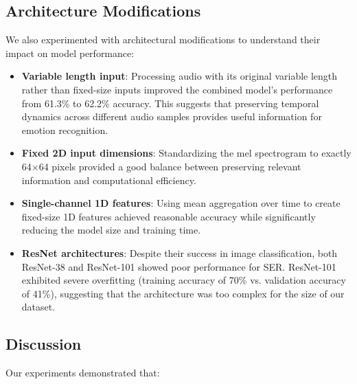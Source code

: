 \subsection{Architecture Modifications}

We also experimented with architectural modifications to understand their impact on model performance:

\begin{itemize}
    \item \textbf{Variable length input}: Processing audio with its original variable length rather than fixed-size inputs improved the combined model's performance from 61.3\% to 62.2\% accuracy. This suggests that preserving temporal dynamics across different audio samples provides useful information for emotion recognition.
    
    \item \textbf{Fixed 2D input dimensions}: Standardizing the mel spectrogram to exactly 64×64 pixels provided a good balance between preserving relevant information and computational efficiency.
    
    \item \textbf{Single-channel 1D features}: Using mean aggregation over time to create fixed-size 1D features achieved reasonable accuracy while significantly reducing the model size and training time.
    
    \item \textbf{ResNet architectures}: Despite their success in image classification, both ResNet-38 and ResNet-101 showed poor performance for SER. ResNet-101 exhibited severe overfitting (training accuracy of 70\% vs. validation accuracy of 41\%), suggesting that the architecture was too complex for the size of our dataset.
\end{itemize}

\subsection{Discussion}

Our experiments demonstrated that:

